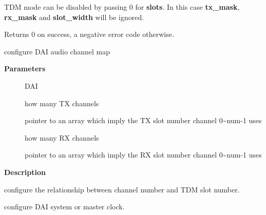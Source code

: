 \documentclass[a4paper,8pt,english]{sphinxmanual}
\begin{document}
TDM mode can be disabled by passing 0 for \textbf{slots}. In this case \textbf{tx\_mask},
\textbf{rx\_mask} and \textbf{slot\_width} will be ignored.

Returns 0 on success, a negative error code otherwise.

\begin{fulllineitems}
\label{sound/kernel-api/alsa-driver-api:c.snd_soc_dai_set_channel_map}
configure DAI audio channel map

\end{fulllineitems}


\textbf{Parameters}
\begin{description}
\item[{}] \leavevmode
DAI

\item[{}] \leavevmode
how many TX channels

\item[{}] \leavevmode
pointer to an array which imply the TX slot number channel
0\textasciitilde{}num-1 uses

\item[{}] \leavevmode
how many RX channels

\item[{}] \leavevmode
pointer to an array which imply the RX slot number channel
0\textasciitilde{}num-1 uses

\end{description}

\textbf{Description}

configure the relationship between channel number and TDM slot number.

\begin{fulllineitems}
\label{sound/kernel-api/alsa-driver-api:c.snd_soc_dai_set_tristate}
configure DAI system or master clock.

\end{fulllineitems}
\end{document}
